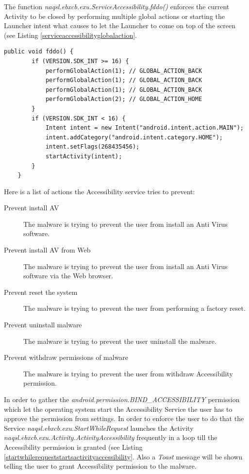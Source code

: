 \documentclass[10pt,titlepage]{article}
\begin{document}
The function \textit{naqsl.ebxcb.exu.ServiceAccessibility.fddo()} enforces the current Activity to be closed by performing multiple global actions or starting the Launcher intent what causes to let the Launcher to come on top of the screen (see Listing \ref{serviceaccessibilityglobalaction}.

\begin{lstlisting}[label=serviceaccessibilityglobalaction,caption=The function \textit{naqsl.ebxcb.exu.ServiceAccessibility.fddo()} presses three times back and then leaves the current App or calls \textit{android.app.Activity.startActivity()} using the Launcher intent in order to bring the Launcher on top of the streen.,frame=tb]
    public void fddo() {
        if (VERSION.SDK_INT >= 16) {
            performGlobalAction(1); // GLOBAL_ACTION_BACK
            performGlobalAction(1); // GLOBAL_ACTION_BACK
            performGlobalAction(1); // GLOBAL_ACTION_BACK
            performGlobalAction(2); // GLOBAL_ACTION_HOME
        }
        if (VERSION.SDK_INT < 16) {
            Intent intent = new Intent("android.intent.action.MAIN");
            intent.addCategory("android.intent.category.HOME");
            intent.setFlags(268435456);
            startActivity(intent);
        }
    }
\end{lstlisting}

Here is a list of actions the Accessibility service tries to prevent:

\begin{description}
\item[Prevent install AV] The malware is trying to prevent the user from install an Anti Virus software.
\item[Prevent install AV from Web] The malware is trying to prevent the user from install an Anti Virus software via the Web browser.
\item[Prevent reset the system] The malware is trying to prevent the user from performing a factory reset.
\item[Prevent uninstall malware] The malware is trying to prevent the user uninstall the malware.
\item[Prevent withdraw permissions of malware] The malware is trying to prevent the user from withdraw Accessibility permission.
\end{description}

In order to gather the \textit{android.permission.BIND\_ACCESSIBILITY} permission which let the operating system start the Accessibility Service the user has to approve the permission from settings. In order to enforce the user to do that the Service \textit{naqsl.ebxcb.exu.StartWhileRequest} launches the Activity \textit{naqsl.ebxcb.exu.Activity.ActivityAccessibility} frequently in a loop till the Accessibility permission is granted (see Listing \ref{startwhilerequeststartsactivityaccessibility}. Also a \textit{Toast} message will be shown telling the user to grant Accessibility permission to the malware.
\end{document}
